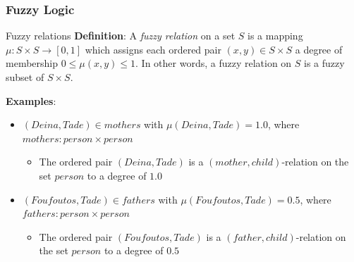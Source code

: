 
\begin{frame}
	\frametitle{Fuzzy Logic}

	\begin{block}{Fuzzy relations}
		\textbf{Definition}: A \textit{fuzzy relation} on a set $S$ is a mapping $\mu: S \times S \rightarrow [0, 1]$ which assigns each ordered pair $(x, y) \in S \times S$ a degree of membership $0 \le \mu(x, y) \le 1$. In other words, a fuzzy relation on $S$ is a fuzzy subset of $S \times S$.

		\vspace*{2em}

		\textbf{Examples}:
		\begin{itemize}
			\item $(Deina, Tade) \in mothers$ with $\mu(Deina, Tade) = 1.0$, where $mothers: person \times person$
			\begin{itemize}
				\item The ordered pair $(Deina, Tade)$ is a $(mother, child)$-relation on the set $person$ to a degree of $1.0$
			\end{itemize}
			\item $(Foufoutos, Tade) \in fathers$ with $\mu(Foufoutos, Tade) = 0.5$, where $fathers: person \times person$
			\begin{itemize}
				\item The ordered pair $(Foufoutos, Tade)$ is a $(father, child)$-relation on the set $person$ to a degree of $0.5$
			\end{itemize}
		\end{itemize}
	\end{block}
\end{frame}

